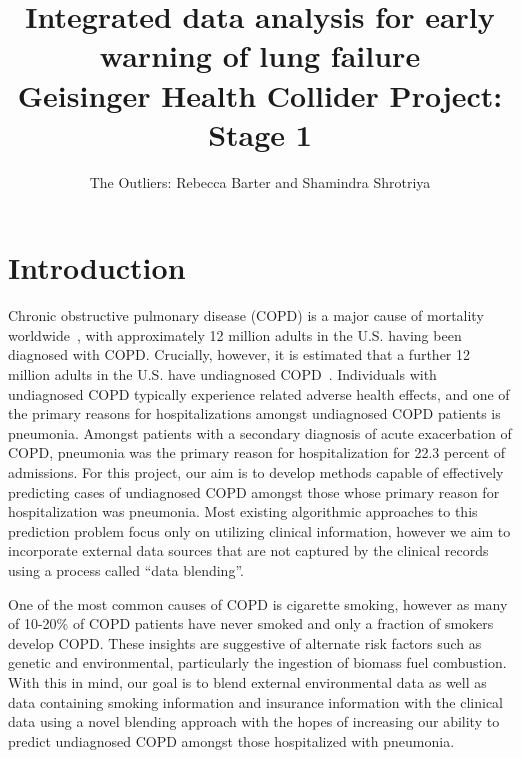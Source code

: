 \documentclass{article}
\title{Integrated data analysis for early warning of lung failure \\ \large{Geisinger Health Collider Project: Stage 1}}
\author{The Outliers: Rebecca Barter and Shamindra Shrotriya}
\begin{document}
\maketitle


\section{Introduction}

Chronic obstructive pulmonary disease (COPD) is a major cause of mortality worldwide~\cite{lozano_global_2012}, with approximately 12 million adults in the U.S. having been diagnosed with COPD. Crucially, however, it is estimated that a further 12 million adults in the U.S. have undiagnosed COPD~\cite{nih_chronic_2010}. Individuals with undiagnosed COPD typically experience related adverse health effects, and one of the primary reasons for hospitalizations amongst undiagnosed COPD patients is pneumonia. Amongst patients with a secondary diagnosis of acute exacerbation of COPD, pneumonia was the primary reason for hospitalization for 22.3 percent of admissions. For this project, our aim is to develop methods capable of effectively predicting cases of undiagnosed COPD amongst those whose primary reason for hospitalization was pneumonia. Most existing algorithmic approaches to this prediction problem focus only on utilizing clinical information, however we aim to incorporate external data sources that are not captured by the clinical records using a process called ``data blending''. 

One of the most common causes of COPD is cigarette smoking, however as many of 10-20\% of COPD patients have never smoked and only a fraction of smokers develop COPD. These insights are suggestive of alternate risk factors such as genetic and environmental, particularly the ingestion of biomass fuel combustion. With this in mind, our goal is to blend external environmental data as well as data containing smoking information and insurance information with the clinical data using a novel blending approach with the hopes of increasing our ability to predict undiagnosed COPD amongst those hospitalized with pneumonia. 

%
\end{document}
